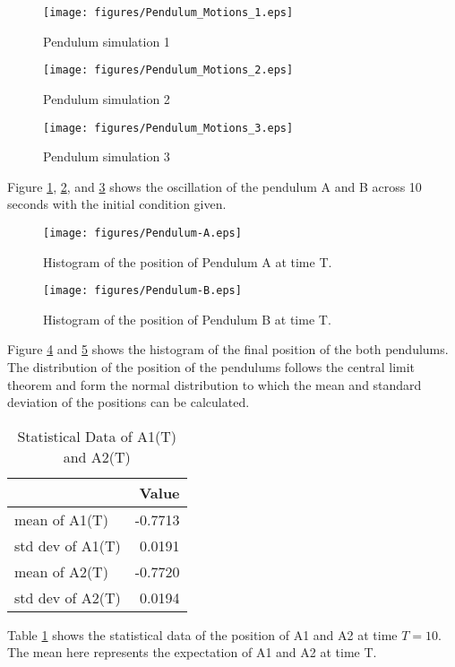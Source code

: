 \documentclass{article}
\begin{document}
\begin{figure}[H]
\centering
\texttt{[image: figures/Pendulum\_Motions\_1.eps]}
\caption{Pendulum simulation 1}
\label{fig:q1-pend-sim-1}
\end{figure}

\begin{figure}[H]
\centering
\texttt{[image: figures/Pendulum\_Motions\_2.eps]}
\caption{Pendulum simulation 2}
\label{fig:q1-pend-sim-2}
\end{figure}

\begin{figure}[H]
\centering
\texttt{[image: figures/Pendulum\_Motions\_3.eps]}
\caption{Pendulum simulation 3}
\label{fig:q1-pend-sim-3}
\end{figure}

Figure \ref{fig:q1-pend-sim-1}, \ref{fig:q1-pend-sim-2}, and \ref{fig:q1-pend-sim-3} shows the oscillation of the pendulum A and B across 10 seconds with the initial condition given.

\begin{figure}[H]
  \centering
  \texttt{[image: figures/Pendulum-A.eps]}
  \caption{Histogram of the position of Pendulum A at time T.}
  \label{fig:figures-Pendulum-A-eps}
\end{figure}

\begin{figure}[H]
  \centering
  \texttt{[image: figures/Pendulum-B.eps]}
  \caption{Histogram of the position of Pendulum B at time T.}
  \label{fig:figures-Pendulum-B-eps}
\end{figure}
Figure \ref{fig:figures-Pendulum-A-eps} and \ref{fig:figures-Pendulum-B-eps} shows the histogram of the final position of the both pendulums. The distribution of the position of the pendulums follows the central limit theorem and form the normal distribution to which the mean and standard deviation of the positions can be calculated. 


\begin{table}[H]
\centering
\caption{Statistical Data of A1(T) and A2(T)}
\label{tab:statistical data a1 a2}
\begin{tabular}{|l|r|}
\hline
\textbf{}       & \textbf{Value} \\
\hline
mean of A1(T)   & -0.7713        \\
std dev of A1(T) & 0.0191         \\
mean of A2(T)   & -0.7720        \\
std dev of A2(T) & 0.0194         \\
\hline
\end{tabular}
\end{table}
Table \ref{tab:statistical data a1 a2} shows the statistical data of the position of A1 and A2 at time $T=10$. The mean here represents the expectation of A1 and A2 at time T.
\end{document}
